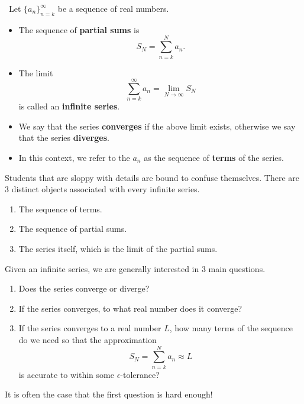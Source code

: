 \setcounter{chapter}{10}
\setcounter{section}{2}
\setcounter{theorem}{0}
\setcounter{equation}{0}


\begin{definition}\,
Let $\{a_n\}_{n=k}^\infty$ be a sequence of real numbers.
\begin{itemize}
\item The sequence of \textbf{partial sums} is 
\begin{equation*}
S_N = \sum_{n=k}^Na_n.
\end{equation*}
\item The limit 
\begin{equation*}
\sum_{n=k}^\infty a_n = \lim_{N\to\infty}S_N
\end{equation*}
is called an \textbf{infinite series}.
\item We say that the series \textbf{converges} if the above limit exists, otherwise we say that the series \textbf{diverges}.
\item In this context, we refer to the $a_n$ as the sequence of \textbf{terms} of the series.
\end{itemize}
\end{definition}

\vfill

\begin{remark}[Caution]
Students that are sloppy with details are bound to confuse themselves.
There are 3 distinct objects associated with every infinite series.
\begin{enumerate}
\item The sequence of terms.
\item The sequence of partial sums.
\item The series itself, which is the limit of the partial sums.
\end{enumerate}
\end{remark}

\vfill

\begin{remark}
Given an infinite series, we are generally interested in 3 main questions.
\begin{enumerate}
\item Does the series converge or diverge?  
\item If the series converges, to what real number does it converge?
\item If the series converges to a real number $L$, how many terms of the sequence do we need so that the approximation
\begin{equation*}
S_N = \sum_{n=k}^N a_n \approx L
\end{equation*}
is accurate to within some $\epsilon$-tolerance?
\end{enumerate}
It is often the case that the first question is hard enough!
\end{remark}

